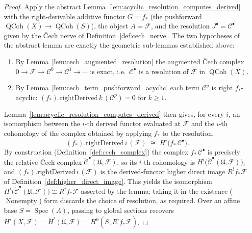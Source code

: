 \begin{proof}
  Apply the abstract Lemma~\ref{lem:acyclic_resolution_computes_derived} with the
  right-derivable additive functor \(G = f_*\)
  (the pushforward \(\operatorname{QCoh}(X) \to \operatorname{QCoh}(S)\)), the object
  \(A = \mathcal{F}\), and the resolution \(J^\bullet = \mathcal{C}^\bullet\) given by
  the {\v C}ech nerve of Definition~\ref{def:cech_nerve}. The two hypotheses of the
  abstract lemma are exactly the geometric sub-lemmas established above:
  \begin{enumerate}
    \item By Lemma~\ref{lem:cech_augmented_resolution} the augmented {\v C}ech
      complex \(0 \to \mathcal{F} \to \mathcal{C}^0 \to \mathcal{C}^1 \to \cdots\) is
      exact, i.e.\ \(\mathcal{C}^\bullet\) is a resolution of \(\mathcal{F}\) in
      \(\operatorname{QCoh}(X)\).
    \item By Lemma~\ref{lem:cech_term_pushforward_acyclic} each term
      \(\mathcal{C}^p\) is right \(f_*\)-acyclic:
      \((f_*).\mathrm{rightDerived}\,k\,(\mathcal{C}^p) = 0\) for \(k \geq 1\).
  \end{enumerate}
  Lemma~\ref{lem:acyclic_resolution_computes_derived} then gives, for every \(i\), an
  isomorphism between the \(i\)-th derived functor evaluated at \(\mathcal{F}\) and
  the \(i\)-th cohomology of the complex obtained by applying \(f_*\) to the
  resolution,
  \[
    (f_*).\mathrm{rightDerived}\,i\,(\mathcal{F})
      \;\cong\;
    H^i\bigl(f_*\,\mathcal{C}^\bullet\bigr).
  \]
  By construction (Definition~\ref{def:cech_complex}) the complex \(f_*\,
  \mathcal{C}^\bullet\) is precisely the relative {\v C}ech complex
  \(\check{\mathcal{C}}^\bullet(\mathfrak{U}, \mathcal{F})\), so its \(i\)-th
  cohomology is \(H^i\bigl(\check{\mathcal{C}}^\bullet(\mathfrak{U}, \mathcal{F})
  \bigr)\); and \((f_*).\mathrm{rightDerived}\,i\,(\mathcal{F})\) is the
  derived-functor higher direct image \(R^i f_*\mathcal{F}\) of
  Definition~\ref{def:higher_direct_image}. This yields the isomorphism
  \(H^i\bigl(\check{\mathcal{C}}^\bullet(\mathfrak{U}, \mathcal{F})\bigr) \cong
  R^i f_*\mathcal{F}\) asserted by the lemma; taking it in the existence
  (\(\operatorname{Nonempty}\)) form discards the choice of resolution, as required.
  Over an affine base \(S = \operatorname{Spec}(A)\), passing to global sections
  recovers \(H^i(X, \mathcal{F}) = \check{H}^i(\mathfrak{U}, \mathcal{F}) = H^0(S,
  R^i f_*\mathcal{F})\).
\end{proof}

